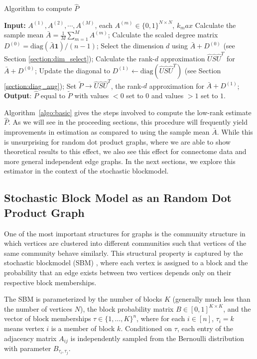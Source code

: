 \documentclass[10pt,letterpaper]{article}
\begin{document}
\begin{algorithm}[H]
\caption{Algorithm to compute $\hat{P}$}
\label{algo:basic}
\begin{algorithmic}[1]
\STATE \textbf{Input:} $A^{(1)}, A^{(2)}, \cdots, A^{(M)}$, each $A^{(m)} \in \{0,1\}^{N \times N}$, $k_max$
\STATE Calculate the sample mean $\bar{A} = \frac{1}{M}\sum\limits_{m = 1}^M A^{(m)}$;
\STATE Calculate the scaled degree matrix $D^{(0)} = \mathrm{diag}(\bar{A} \bm{1})/(n-1)$;
\STATE Select the dimension $d$  using $\bar{A} + D^{(0)}$ (see Section \ref{section:dim_select});
\STATE Calculate the rank-$d$ approximation $\hat{U} \hat{S} \hat{U}^T$ for $\bar{A} + D^{(0)}$;
\STATE Update the diagonal to $D^{(1)} \leftarrow \mathrm{diag}(\hat{U} \hat{S} \hat{U}^T)$ (see Section \ref{section:diag_aug}); 
\STATE Set $\tilde{P}\rightarrow\hat{U} \hat{S} \hat{U}^T$, the rank-$d$ approximation for $\bar{A} + D^{(1)}$;
\STATE \textbf{Output}: $\hat{P}$ equal to $\tilde{P}$ with values $<0$ set to $0$ and values $>1$ set to $1$.
\end{algorithmic}
\end{algorithm}


Algorithm~\ref{algo:basic} gives the steps involved to compute the low-rank estimate $\hat{P}$.
As we will see in the proceeding sections, this procedure will frequently yield improvements in estimation as compared to using the sample mean $\bar{A}$.
While this is unsurprising for random dot product graphs, where we are able to show theoretical results to this effect, we also see this effect for connectome data and more general independent edge graphs.
In the next sections, we explore this estimator in the context of the stochastic blockmodel.

\subsection{Stochastic Block Model as an Random Dot Product Graph}
\label{section:sbm_rdpg}
One of the most important structures for graphs is the community structure in which vertices are clustered into different communities such that vertices of the same community behave similarly. This structural property is captured by the stochastic blockmodel (SBM) \cite{holland1983stochastic}, where each vertex is assigned to a block and the probability that an edge exists between two vertices depends only on their respective block memberships.

The SBM is parameterized by the number of blocks $K$ (generally much less than the number of vertices $N$), the block probability matrix $B \in [0,1]^{K \times K}$, and the vector of block memberships
$\tau\in\{1,\dotsc,K\}^n$, where for each $i \in [n]$, $\tau_i = k$ means vertex $i$ is a member of block $k$.
Conditioned on $\tau$, each entry of the adjacency matrix $A_{ij}$ is independently sampled from the Bernoulli distribution with parameter $B_{\tau_i,\tau_j}$.
\end{document}
